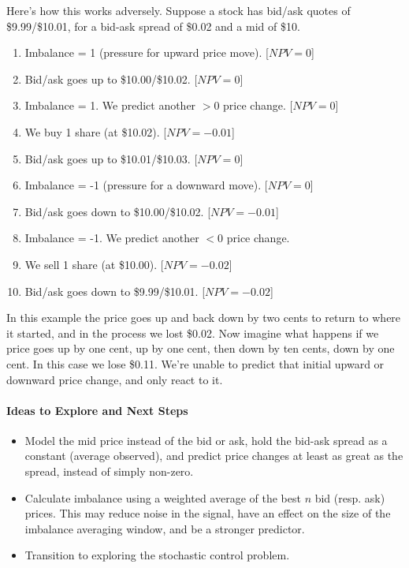 \documentclass[12pt]{article}
\begin{document}
Here's how this works adversely. Suppose a stock has bid/ask quotes of \$9.99/\$10.01, for a bid-ask spread of \$0.02 and a mid of \$10.

\begin{enumerate}
\item Imbalance = 1 (pressure for upward price move). [$NPV = 0$]
\item Bid/ask goes up to \$10.00/\$10.02. [$NPV = 0$]
\item Imbalance = 1. We predict another $>0$ price change. [$NPV = 0$]
\item We buy 1 share (at \$10.02). [$NPV = -0.01$]
\item Bid/ask goes up to \$10.01/\$10.03. [$NPV = 0$]
\item Imbalance = -1 (pressure for a downward move). [$NPV = 0$]
\item Bid/ask goes down to \$10.00/\$10.02. [$NPV = -0.01$]
\item Imbalance = -1. We predict another $<0$ price change. 
\item We sell 1 share (at \$10.00). [$NPV = -0.02$]
\item Bid/ask goes down to \$9.99/\$10.01. [$NPV = -0.02$]
\end{enumerate}

In this example the price goes up and back down by two cents to return to where it started, and in the process we lost \$0.02. Now imagine what happens if we price goes up by one cent, up by one cent, then down by ten cents, down by one cent. In this case we lose \$0.11. We're unable to predict that initial upward or downward price change, and only react to it. 

\paragraph{Ideas to Explore and Next Steps}
\begin{itemize}
\item Model the mid price instead of the bid or ask, hold the bid-ask spread as a constant (average observed), and predict price changes at least as great as the spread, instead of simply non-zero.
\item Calculate imbalance using a weighted average of the best $n$ bid (resp. ask) prices. This may reduce noise in the signal, have an effect on the size of the imbalance averaging window, and be a stronger predictor.
\item Transition to exploring the stochastic control problem.
\end{itemize}
\end{document}
